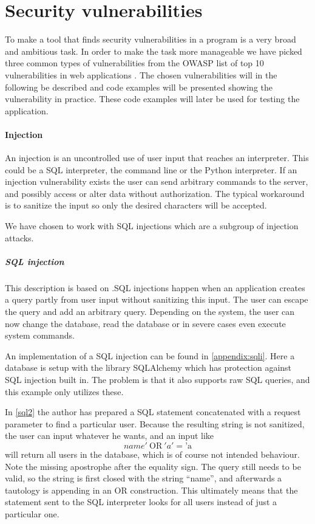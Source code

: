 \section{Security vulnerabilities}

To make a tool that finds security vulnerabilities in a program is a very broad and ambitious task.
In order to make the task more manageable we have picked three common types of vulnerabilities from the OWASP list of top 10 vulnerabilities in web applications \cite{OWASP10}.
The chosen vulnerabilities will in the following be described and code examples will be presented showing the vulnerability in practice.
These code examples will later be used for testing the application.

\paragraph{Injection}
An injection is an uncontrolled use of user input that reaches an interpreter.
This could be a SQL interpreter, the command line or the Python interpreter.
If an injection vulnerability exists the user can  send arbitrary commands to the server, and possibly access or alter data without authorization.
The typical workaround is to sanitize the input so only the desired characters will be accepted. \citep{OWASPTOP10PDF}

We have chosen to work with SQL injections which are a subgroup of injection attacks.

\subparagraph{SQL injection}
This description is based on \citet{sqlinjection}.SQL injections happen when an application creates a query partly from user input without sanitizing this input.
The user can escape the query and add an arbitrary query.
Depending on the system, the user can now change the database, read the database or in severe cases even execute system commands.

An implementation of a SQL injection can be found in \cref{appendix:sqli}.
Here a database is setup with the library SQLAlchemy which has protection against SQL injection built in.
The problem is that it also supports raw SQL queries, and this example only utilizes these.

In \cref{sql2} the author has prepared a SQL statement concatenated with a request parameter to find a particular user.
Because the resulting string is not sanitized, the user can input whatever he wants, and an input like
\[ name' ~ \text{OR} ~ 'a' = \text{'a} \]
will return all users in the database, which is of course not intended behaviour.
Note the missing apostrophe after the equality sign.
The query still needs to be valid, so the string is first closed with the string ``name'', and afterwards a tautology is appending in an OR construction.
This ultimately means that the statement sent to the SQL interpreter looks for all users instead of just a particular one.

